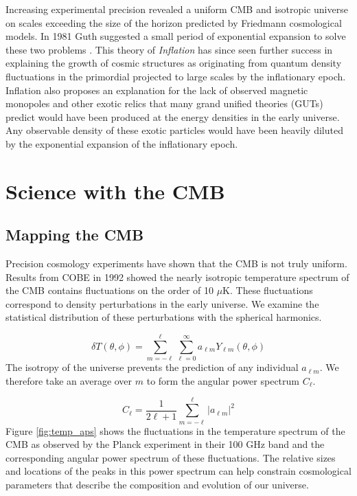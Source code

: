 \documentclass[12pt]{article}
\begin{document}
Increasing experimental precision revealed a uniform CMB and isotropic
universe on scales exceeding the size of the horizon predicted by
Friedmann cosmological models. In 1981 Guth suggested a small period of
exponential expansion to solve these two problems \cite{cite:Guth}. This
theory of \textit{Inflation} has since seen further success in explaining the growth of cosmic structures
as originating from quantum density fluctuations in the primordial projected
to large scales by the inflationary epoch. Inflation also proposes an
explanation for the lack of observed magnetic monopoles and other exotic
relics that many grand unified theories (GUTs) predict would have been
produced at the energy densities in the early universe. Any observable
density of these exotic particles would have been heavily diluted by the
exponential expansion of the inflationary epoch.





\section{Science with the CMB}

\subsection{Mapping the CMB}
Precision cosmology experiments have shown that the CMB is not truly uniform.
Results from COBE in 1992 \cite{cite:COBE} showed the nearly
isotropic temperature spectrum of the CMB contains
fluctuations on the order of 10 $\mu$K. These fluctuations correspond to
density perturbations in the early universe.  We examine the statistical
distribution of these perturbations with the spherical harmonics.


\begin{equation}
	\delta T(\theta,\phi) = \sum _{m=-\ell} ^\ell \sum _{\ell=0} ^\infty
	a_{\ell m}Y_{\ell m}(\theta,\phi)
\end{equation}
The isotropy of the universe prevents the prediction of any individual $a_{\ell
m}$. We therefore take an average over $m$ to form the
angular power spectrum $C_\ell$.

\begin{equation}
	C_{\ell} = \frac{1}{2\ell +1}\sum _{m=-\ell} ^\ell |a_{\ell m}|^2
\end{equation}
Figure \ref{fig:temp_aps} shows the fluctuations in the temperature spectrum
of the CMB as observed by the Planck experiment in their 100 GHz band and the
corresponding angular power spectrum of these fluctuations. The relative sizes
and locations of the peaks in this power spectrum can help constrain
cosmological parameters that describe the composition and evolution of our
universe. 
\end{document}
